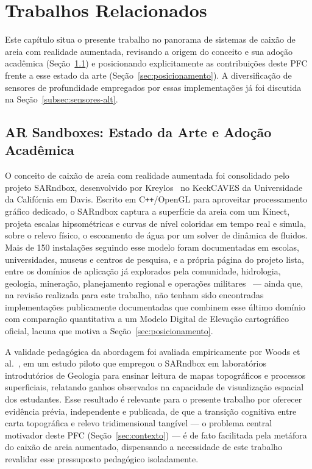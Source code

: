 
\chapter{Trabalhos Relacionados}
\label{cap:relacionados}

Este capítulo situa o presente trabalho no panorama de sistemas de
caixão de areia com realidade aumentada, revisando a origem do
conceito e sua adoção acadêmica (Seção~\ref{sec:estado-arte}) e
posicionando explicitamente as contribuições deste PFC frente a esse
estado da arte (Seção~\ref{sec:posicionamento}). A diversificação de
sensores de profundidade empregados por essas implementações já foi
discutida na Seção~\ref{subsec:sensores-alt}.

\section{AR Sandboxes: Estado da Arte e Adoção Acadêmica}
\label{sec:estado-arte}

O conceito de caixão de areia com realidade aumentada foi consolidado
pelo projeto SARndbox, desenvolvido por
Kreylos~ no KeckCAVES da Universidade da Califórnia em
Davis. Escrito em C\texttt{++}/OpenGL para aproveitar processamento
gráfico dedicado, o SARndbox captura a superfície da areia com um
Kinect, projeta escalas hipsométricas e curvas de nível coloridas em
tempo real e simula, sobre o relevo físico, o escoamento de água por
um solver de dinâmica de fluidos. Mais de 150 instalações seguindo
esse modelo foram documentadas em escolas, universidades, museus e
centros de pesquisa, e a própria página do projeto lista, entre os
domínios de aplicação já explorados pela comunidade, hidrologia,
geologia, mineração, planejamento regional e operações
militares~\cite{sarndbox} — ainda que, na revisão realizada para
este trabalho, não tenham sido encontradas implementações
publicamente documentadas que combinem esse último domínio com
comparação quantitativa a um Modelo Digital de Elevação cartográfico
oficial, lacuna que motiva a Seção~\ref{sec:posicionamento}.

A validade pedagógica da abordagem foi avaliada empiricamente por
Woods et al.~, em um estudo piloto que empregou o
SARndbox em laboratórios introdutórios de Geologia para ensinar
leitura de mapas topográficos e processos superficiais, relatando
ganhos observados na capacidade de visualização espacial dos
estudantes. Esse resultado é relevante para o presente trabalho por
oferecer evidência prévia, independente e publicada, de que a
transição cognitiva entre carta topográfica e relevo tridimensional
tangível — o problema central motivador deste PFC
(Seção~\ref{sec:contexto}) — é de fato facilitada pela metáfora do
caixão de areia aumentado, dispensando a necessidade de este trabalho
revalidar esse pressuposto pedagógico isoladamente.

